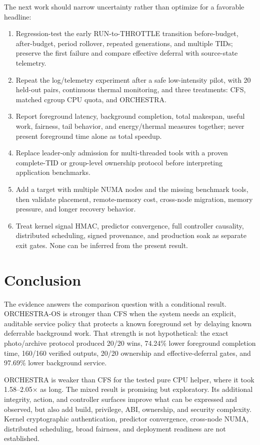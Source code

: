 \documentclass[10pt,letterpaper,twocolumn]{article}
\begin{document}
The next work should narrow uncertainty rather than optimize for a favorable headline:

\begin{enumerate}
  \item Regression-test the early RUN-to-THROTTLE transition before-budget, after-budget, period rollover, repeated \mbox{generations}, and multiple TIDs; preserve the first failure and compare effective deferral with source-state telemetry.
  \item Repeat the log/telemetry experiment after a safe low-intensity pilot, with 20 held-out pairs, continuous thermal monitoring, and three treatments: CFS, matched cgroup CPU quota, and ORCHESTRA.
  \item Report foreground latency, background completion, total makespan, useful work, fairness, tail behavior, and energy/thermal measures together; never present foreground time alone as total speedup.
  \item Replace leader-only admission for multi-threaded tools with a proven complete-TID or group-level ownership protocol before interpreting application benchmarks.
  \item Add a target with multiple NUMA nodes and the missing benchmark tools, then validate placement, remote-memory cost, cross-node migration, memory pressure, and longer recovery behavior.
  \item Treat kernel signal HMAC, predictor convergence, full controller causality, distributed scheduling, signed provenance, and production soak as separate exit gates. None can be inferred from the present result.
\end{enumerate}

\section{Conclusion}

The evidence answers the comparison question with a conditional result. ORCHESTRA-OS is stronger than CFS when the system needs an explicit, auditable service policy that protects a known foreground set by delaying known deferrable background work. That strength is not hypothetical: the exact photo/archive protocol produced 20/20 wins, 74.24\% lower foreground completion time, 160/160 verified outputs, 20/20 ownership and effective-deferral gates, and 97.69\% lower background service.

ORCHESTRA is weaker than CFS for the tested pure CPU helper, where it took 1.58--2.05$\times$ as long. The mixed result is promising but exploratory. Its additional integrity, action, and controller surfaces improve what can be expressed and observed, but also add build, privilege, ABI, ownership, and security complexity. Kernel cryptographic authentication, predictor convergence, cross-node NUMA, distributed scheduling, broad fairness, and deployment readiness are not established.
\end{document}
